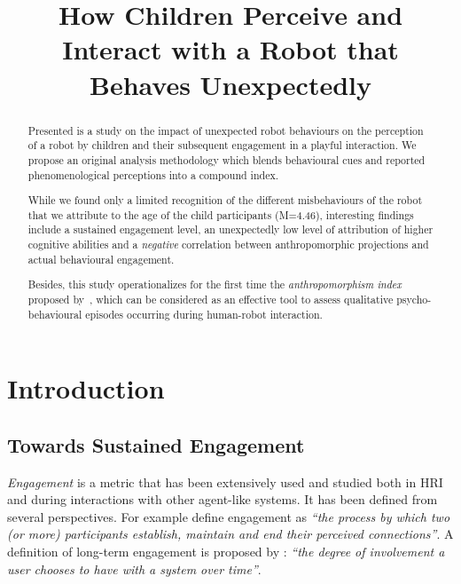 \documentclass{sig-alternate}
\title{\LARGE \bf
How Children Perceive and Interact with a Robot that Behaves Unexpectedly
}
\begin{document}
\sloppy %
\maketitle
\begin{abstract}

Presented is a study on the impact of unexpected robot behaviours on the
perception of a robot by children and their subsequent engagement in a playful interaction.
We propose an original analysis methodology which blends behavioural cues and
reported phenomenological perceptions into a compound index.

While we found only a limited recognition of the different misbehaviours of the
robot that we attribute to the age of the child participants (M=4.46),
interesting findings include a sustained engagement level, an unexpectedly low
level of attribution of higher cognitive abilities and a \emph{negative}
correlation between anthropomorphic projections and actual behavioural
engagement.

Besides, this study operationalizes for the first time the
\emph{anthropomorphism index} proposed by~\cite{fink2014dynamics}, which can be
considered as an effective tool to assess qualitative psycho-behavioural
episodes occurring during human-robot interaction.

\end{abstract}
\section{Introduction}
\subsection{Towards Sustained Engagement}

\emph{Engagement} is a metric that has been extensively used and studied both
in HRI and during interactions with other agent-like systems. It has been
defined from several perspectives. For example \cite{sidner_where_2004} define
engagement as \textit{``the process by which two (or more) participants
establish, maintain and end their perceived connections''}. A definition of
long-term engagement is proposed by \cite{bickmore_maintaining_2010}:
\textit{``the degree of involvement a user chooses to have with a system over
time''}.
\end{document}
